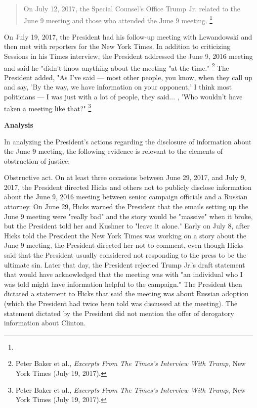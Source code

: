 \begin{quote}
On July 12, 2017, the Special Counsel's Office  Trump Jr.
 related to the June 9 meeting and those who attended the June 9 meeting.%
\footnote{}
\end{quote}

On July 19, 2017, the President had his follow-up meeting with Lewandowski and then met with reporters for the New York Times.
In addition to criticizing Sessions in his Times interview, the President addressed the June 9, 2016 meeting and said he "didn't know anything about the meeting "at the time."%
\footnote{Peter Baker et al., \textit{Excerpts From The Times’s Interview With Trump}, New York Times (July 19, 2017).}
The President added, "As I've said — most other people, you know, when they call up and say, 'By the way, we have information on your opponent,' I think most politicians — I was just with a lot of people, they said... ,
'Who wouldn't have taken a meeting like that?"%
\footnote{Peter Baker et al., \textit{Excerpts From The Times’s Interview With Trump}, New York Times (July 19, 2017).}

\begin{center}
\textbf{Analysis}
\end{center}

In analyzing the President's actions regarding the disclosure of information about the June 9 meeting, the following evidence is relevant to the elements of obstruction of justice:

Obstructive act.
On at least three occasions between June 29, 2017, and July 9, 2017, the President directed Hicks and others not to publicly disclose information about the June 9, 2016 meeting between senior campaign officials and a Russian attorney.
On June 29, Hicks warned the President that the emails setting up the June 9 meeting were "really bad" and the story would be "massive" when it broke, but the President told her and Kushner to "leave it alone."
Early on July 8, after Hicks told the President the New York Times was working on a story about the June 9 meeting, the President directed her not to comment, even though Hicks said that the President usually considered not responding to the press to be the ultimate sin.
Later that day, the President rejected Trump Jr.'s draft statement that would have acknowledged that the meeting was with "an individual who I was told might have information helpful to the campaign." The President then dictated a statement to Hicks that said the meeting was about Russian adoption (which the President had twice been told was discussed at the meeting).
The statement dictated by the President did not mention the offer of derogatory information about Clinton.

